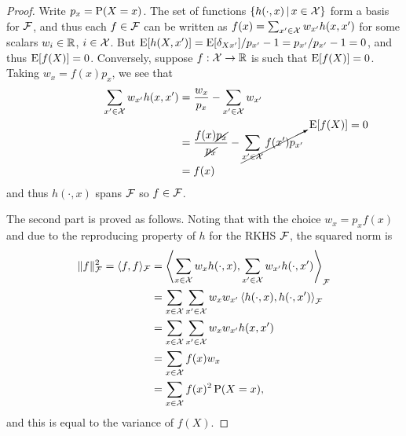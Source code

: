 \begin{proof}
  Write $p_x = \operatorname{P}(X=x)$.
  The set of functions $\{h(\cdot,x) \,|\, x \in {\mathcal X}\}$ form a basis for ${\mathcal F}$, and thus each $f \in {\mathcal F}$ can be written as $f(x) = \sum_{x'\in{\mathcal X}} w_{x'}h(x,x')$ for some scalars $w_i\in\mathbb{R}$, $i\in{\mathcal X}$.
  But $\operatorname{E}[ h(X,x')] = \operatorname{E} [\delta_{Xx'}] / p_{x'} - 1 = p_{x'} / p_{x'} - 1 = 0$, and thus $\operatorname{E} [f(X)] = 0$.
  Conversely, suppose $f:{\mathcal X}\to\mathbb{R}$ is such that $\operatorname{E} [f(X)] = 0$.
  Taking $w_x = f(x)p_x$, we see that
  \begin{align*}
    \sum_{x'\in{\mathcal X}} w_{x'}h(x,x') 
    &= \frac{w_x}{p_x} - \sum_{x'\in{\mathcal X}} w_{x'} \\
    &= \frac{f(x)\cancel{p_x}}{\cancel{p_x}} - \cancelto{\operatorname{E} [f(X)] = 0}{\sum_{x'\in{\mathcal X}} f(x') p_{x'}} \\
    &= f(x)
  \end{align*}
  and thus $h(\cdot,x)$ spans ${\mathcal F}$ so $f\in{\mathcal F}$.
  
  The second part is proved as follows.
  Noting that with the choice $w_x = p_xf(x)$ and due to the reproducing property of $h$ for the RKHS ${\mathcal F}$, the squared norm is 
  \begin{align*}
    \lVert f\rVert_{\mathcal F}^2 = \langle f,f\rangle_{\mathcal F} 
    &= \left\langle \sum_{x\in{\mathcal X}} w_{x}h(\cdot,x), \sum_{x'\in{\mathcal X}} w_{x'}h(\cdot,x') \right\rangle_{\mathcal F} \\
    &= \sum_{x\in{\mathcal X}} \sum_{x'\in{\mathcal X}} w_{x} w_{x'} \left\langle h(\cdot,x), h(\cdot,x') \right\rangle_{\mathcal F} \\
    &= \sum_{x\in{\mathcal X}} \sum_{x'\in{\mathcal X}} w_{x} w_{x'} h(x,x')  \\
    &= \sum_{x\in{\mathcal X}} f(x) w_{x}  \\
    &= \sum_{x\in{\mathcal X}} f(x)^2 \operatorname{P}(X=x),
  \end{align*}
  and this is equal to the variance of $f(X)$.
  \vspace{-0.5em}
\end{proof}



